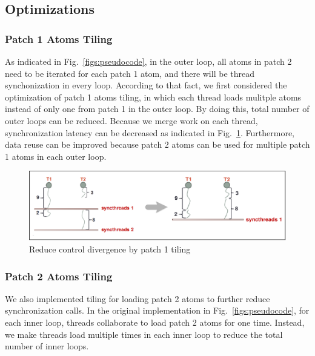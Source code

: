 \subsection{Optimizations}
\subsubsection{Patch 1 Atoms Tiling}

As indicated in Fig.~\ref{figs:pseudocode}, in the outer loop, all atoms in patch 2 need to be iterated for each patch 1 atom,
and there will be thread synchonization in every loop. According to that fact, we first considered the optimization of patch 1 atoms tiling,
in which each thread loads mulitple atoms instead of only one from patch 1 in the outer loop. By doing this, total number of outer loops can be reduced.
Because we merge work on each thread, synchronization latency can be decreased as indicated in Fig.~\ref{figs:divergence}.
Furthermore, data reuse can be improved because patch 2 atoms can be used for multiple patch 1 atoms in each outer loop.

\begin{figure}[h]
\centering
\setlength{\abovecaptionskip}{-1pt}
\setlength{\belowcaptionskip}{-2pt}
\includegraphics[width=6.0in]{figs/divergence.eps}
\caption{Reduce control divergence by patch 1 tiling}
\label{figs:divergence}
\end{figure}

\subsubsection{Patch 2 Atoms Tiling}
We also implemented tiling for loading patch 2 atoms to further reduce synchronization calls. In the original implementation in Fig.~\ref{figs:pseudocode},
for each inner loop, threads collaborate to load patch 2 atoms for one time. Instead, we make threads load multiple times in each inner loop to reduce the
total number of inner loops.


